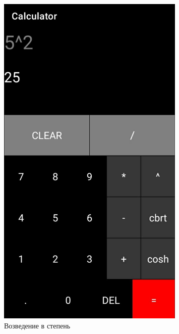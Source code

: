 \documentclass[a4paper, 14pt]{extarticle}
\begin{document}
\begin{figure}[!htb]
	\centering
	\includegraphics[width=0.8\textwidth]{img1}
\caption{Возведение в степень}
\label{fig:img1}
\end{figure}
\end{document}
